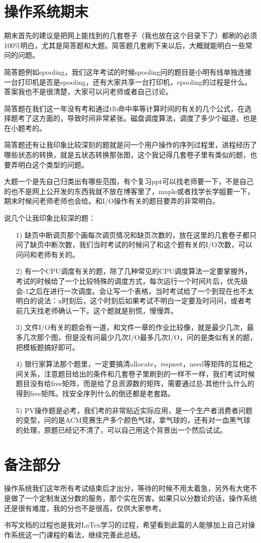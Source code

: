 \documentclass[UTF8]{ctexart}  %
\begin{document}
\section{操作系统期末}
\large{期末首先的建议是把网上能找到的几套卷子（我也放在这个目录下了）都刷的必须100\%明白，尤其是简答题和大题。简答题几套刷下来以后，大概就能明白一些常问的问题。

简答题例如spooling，我们这年考试的时候spooling问的题目是小明有线单独连接一台打印机是否是spooling，还有大家共享一台打印机，spooling的过程是什么。答案我也不是很清楚，大家可以问老师或者自己讨论。

简答题在我们这一年没有考和通过tlb命中率等计算时间的有关的几个公式，在选择题考了这方面的，导致时间非常紧张。磁盘调度算法，调度了多少个磁道，也是在小题考的。

简答题还有让我印象比较深刻的题就是问一个用户操作的序列过程里，进程经历了哪些状态的转换，就是五状态转换那张图，这个我记得几套卷子里有类似的题，也要弄明白这个类型的问题。

大题一个是先自己归类出有哪些范围，有个复习ppt可以找老师要一下，不是自己的也不是网上公开发的东西我就不放在博客里了，maple或者找学长学姐要一下，期末时候问老师老师也会给。和I/O操作有关的题目要弄的非常明白。

说几个让我印象比较深的题：
\begin{itemize}
  \item [1)] 
  缺页中断调页那个画每次调页情况和缺页次数的，放在这里的几套卷子都只问了缺页中断次数，我们当时考试的时候问了和这个题有关的I/O次数，可以问问和老师有关的。     
  \item [2)]
  有一个CPU调度有关的题，除了几种常见的CPU调度算法一定要掌握外，考试的时候给了一个比较特殊的调度方式，每次运行一个时间片后，优先级会-1之后在进行一次调度。会让写一个表格，当时考试给了一个到现在也不太明白的说法：x时刻后，这个时刻后如果考试不明白一定要及时问问，或者考前几天找老师确认一下。这个题就是别慌，慢慢弄。
  \item [3)]
  文件I/O有关的题会有一道，和文件一章的作业比较像，就是最少几次，最多几次那个图，但是没有问最少几次I/O最多几次I/O，问的是类似有关的题，把模板题搞好即可。
  \item [4)]
  银行家算法那个题里，一定要搞清allocate，request，need等矩阵的互相之间关系，注意题目给出的条件和几套卷子里刷到的一样不一样，我们考试时候题目没有给free矩阵，而是给了总资源数的矩阵，需要通过总-其他什么什么的得到free矩阵。找安全序列什么的倒还都是老套路。
  \item [5)]
  PV操作题是必考，我们考的非常贴近实际应用，是一个生产者消费者问题的变型，问的是ACM竞赛生产多个颜色气球，拿气球的，还有对一血黑气球的处理，原题已经记不清了，可以自己用这个背景出一个然后试试。
\end{itemize}
}

\newpage
\section{备注部分}
\large{操作系统我们这年所有考试结束后才出分，等待的时候不用太着急，另外有大佬不是做了一个定制发送分数的服务，那个实在厉害。如果只以分数论的话，操作系统还是很有难度，我的分也不是很高，仅供大家参考。

书写文档的过程也是我对LaTex学习的过程，希望看到此篇的人能够加上自己对操作系统这一门课程的看法，继续完善此总结。}
\end{document}
